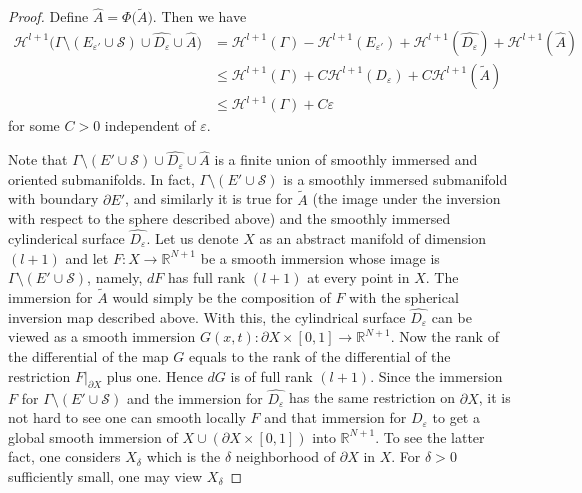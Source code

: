 \documentclass[10pt,a4paper]{amsart}
\newcommand{\R}{\mathbb{R}}
\begin{document}
\begin{proof}
{Define $\widehat{A} =\Phi\big(\widetilde{A}\big)$. Then we have 
\begin{align*}\mathcal{H}^{l+1}\big(\Gamma \setminus (E_{\varepsilon'} \cup \mathcal{S}) \cup \widehat{D_\varepsilon} \cup \widehat{A}\big) 
&= \mathcal{H}^{l+1}(\Gamma) - \mathcal{H}^{l+1}(E_{\varepsilon'}) + \mathcal{H}^{l+1}(\widehat{D_\varepsilon}) 
+ \mathcal{H}^{l+1}(\widehat{A})\\
&\le \mathcal{H}^{l+1}(\Gamma) + C\mathcal{H}^{l+1}({D_\varepsilon}) 
+ C\mathcal{H}^{l+1}(\widetilde{A})\\
& \leq \mathcal{H}^{l+1}(\Gamma) + C \varepsilon
\end{align*}}
for some $C>0$ independent of $\varepsilon$.

Note that $\Gamma \setminus (E' \cup \mathcal{S}) \cup {\widehat{D_{\varepsilon}}
\cup \widehat{A}}$ is a finite union of smoothly immersed and oriented submanifolds.
In fact, $\Gamma \setminus (E'\cup \mathcal{S})$ is a smoothly immersed submanifold with boundary $\partial E'$, and
similarly it is true for $ \widetilde{A}$ (the image under the inversion with respect to the sphere described above) and the smoothly immersed cylinderical
surface {$\widehat{D_\varepsilon}$}. Let us denote $X$ as  an abstract manifold {of dimension $(l+1)$} and let $F : X\to \R^{N+1}$ be a smooth immersion
{whose image is} $\Gamma \setminus (E'\cup \mathcal{S})$,
namely, $dF$ has full rank {$(l+1)$} at every point in $X$. The immersion for $ \widetilde{A}$ would simply be the composition of $F$ 
{with the spherical} inversion map {described above}. With this,
the cylindrical surface {$\widehat{D_\varepsilon}$} can be viewed as a smooth immersion $G(x,t): \partial X \times [0,1]\to {\R^{N+1}}$.
Now  the rank of the differential of the map $G$  equals to  the rank of the differential of  the restriction $F\big|_{\partial X}$ plus one. Hence  $dG$ is  of full rank $(l+1)$.
Since the immersion $F$ {for $\Gamma\setminus (E'\cup\mathcal{S})$ and the immersion for $\widehat{D_\varepsilon}$} has the same restriction on $\partial X$, it is not hard to see one can smooth locally $F$ and that immersion for {$D_\varepsilon$ to get} a global smooth immersion of $X\cup(\partial X \times [0,1])$ into
 {$\R^{N+1}$}.  To see the latter fact, one considers $X_{\delta}$ which is the $\delta$ neighborhood of $\partial X$ in $X$. For $\delta>0$ sufficiently small,  one may view $X_{\delta}$ 

\end{proof}
\end{document}

